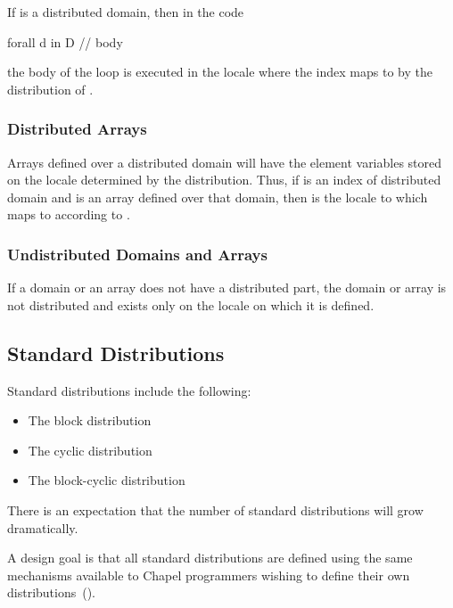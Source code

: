 \begin{example}
If  is a distributed domain, then in the code
\begin{chapel}
forall d in D {
  // body
}
\end{chapel}
the body of the loop is executed in the locale where the
index  maps to by the distribution of .
\end{example}

\subsubsection{Distributed Arrays}
\label{Distributed_Arrays}

Arrays defined over a distributed domain will have the element
variables stored on the locale determined by the distribution.  Thus,
if  is an index of distributed domain  and  is
an array defined over that domain, then  is the
locale to which  maps to according to .

\subsubsection{Undistributed Domains and Arrays}
\label{Undistributed_Domains_and_Arrays}

If a domain or an array does not have a distributed part, the domain
or array is not distributed and exists only on the locale on which it
is defined.

\subsection{Standard Distributions}
\label{Standard_Distributions}

Standard distributions include the following:
\begin{itemize}
\item The block distribution 
\item The cyclic distribution 
\item The block-cyclic distribution 
\end{itemize}

\begin{openissue}
There is an expectation that the number of standard distributions will
grow dramatically.
\end{openissue}

A design goal is that all standard distributions are defined using the
same mechanisms available to Chapel programmers wishing to define
their own distributions~().


